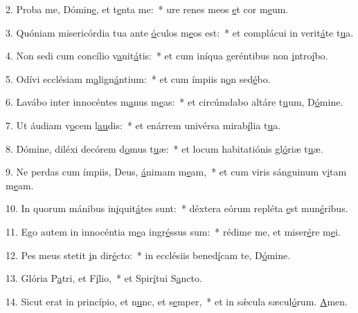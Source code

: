 2. Proba me, Dómin\uline{e}, et t\uline{e}nta me:~* ure renes meos \uline{e}t cor m\uline{e}um.\par 
3. Quóniam misericórdia tua ante \uline{ó}culos m\uline{e}os est:~* et complácui in verit\uline{á}te t\uline{u}a.\par 
4. Non sedi cum concílio v\uline{a}nit\uline{á}tis:~* et cum iníqua geréntibus non \uline{i}ntro\uline{í}bo.\par 
5. Odívi ecclésiam m\uline{a}lign\uline{á}ntium:~* et cum ímpiis n\uline{o}n sed\uline{é}bo.\par 
6. Lavábo inter innocéntes m\uline{a}nus m\uline{e}as:~* et circúmdabo altáre t\uline{u}um, D\uline{ó}mine.\par 
7. Ut áudiam v\uline{o}cem l\uline{au}dis:~* et enárrem univérsa mirab\uline{í}lia t\uline{u}a.\par 
8. Dómine, diléxi decórem d\uline{o}mus t\uline{u}æ:~* et locum habitatiónis gl\uline{ó}riæ t\uline{u}æ.\par 
9. Ne perdas cum ímpiis, Deus, \uline{á}nimam m\uline{e}am,~* et cum viris sánguinum v\uline{i}tam m\uline{e}am.\par 
10. In quorum mánibus in\uline{i}quit\uline{á}tes sunt:~* déxtera eórum repléta \uline{e}st mun\uline{é}ribus.\par 
11. Ego autem in innocéntia m\uline{e}a ingr\uline{é}ssus sum:~* rédime me, et miser\uline{é}re m\uline{e}i.\par 
12. Pes meus stetit \uline{i}n dir\uline{é}cto:~* in ecclésiis bened\uline{í}cam te, D\uline{ó}mine.\par 
13. Glória P\uline{a}tri, et F\uline{í}lio,~* et Spir\uline{í}tui S\uline{a}ncto.\par 
14. Sicut erat in princípio, et n\uline{u}nc, et s\uline{e}mper,~* et in sǽcula sæcul\uline{ó}rum. \uline{A}men.\par 
